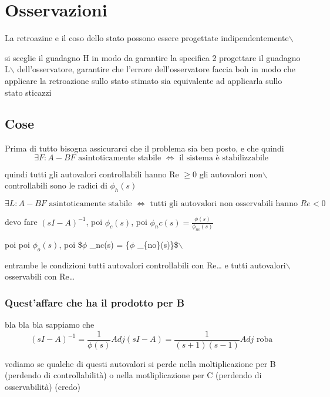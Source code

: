 \documentclass[11pt]{article}
\date{\today}
\title{}
\begin{document}
\tableofcontents

\section{Osservazioni}
\label{sec:org8c9363f}

La retroazine e il coso dello stato possono essere progettate indipendentemente$\backslash$

si sceglie il guadagno H in modo da garantire la specifica 2 progettare il guadagno L$\backslash$
dell'osservatore, garantire che l'errore dell'osservatore faccia boh in modo che applicare
la retroazione sullo stato stimato sia equivalente ad applicarla sullo stato sticazzi

\subsection{Cose}
\label{sec:org94cda24}

Prima di tutto bisogna assicurarci che il problema sia ben posto, e che quindi
\[\exists F : A-BF \text{ asintoticamente stabile } \iff
\text{ il sistema è stabilizzabile } \]

quindi tutti gli autovalori controllabili hanno Re \(\geq 0\) gli autovalori non$\backslash$
controllabili sono le radici di \(\phi _h(s)\)

\[\exists L : A-BF \text{ asintoticamente stabile }
\iff \text{ tutti gli autovalori non osservabili hanno } Re < 0 \]

devo fare \((sI - A)^{-1}\), poi \(\phi _c(s)\), poi \(\phi _nc(s) = \frac{\phi (s)}{\phi
_{nc}(s)}\)

poi poi \(\phi _o(s)\), poi \$\(\phi\) \_nc(s) = \{\(\phi\) \_\{no\}(s)\}\$$\backslash$

entrambe le condizioni tutti autovalori controllabili con Re\ldots{} e tutti autovalori$\backslash$
osservabili con Re\ldots{}

\subsubsection{Quest'affare che ha il prodotto per B}
\label{sec:org67854de}

bla bla bla sappiamo che
\[(sI-A)^{-1} = \frac{1}{\phi (s)} Adj(sI-A) = \frac{1}{(s+1)(s-1)} Adj \text{ roba } \]

vediamo se qualche di questi autovalori si perde nella moltiplicazione per B (perdendo di
controllabilità) o nella motliplicazione per C (perdendo di osservabilità) (credo)
\end{document}
